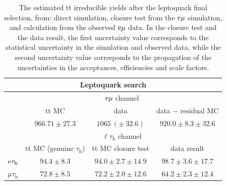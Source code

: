 \documentclass[12pt]{thesis}  %
\newcommand{\tauh}{\ensuremath{\tau_{\text{h}}}\xspace}
\newcommand{\Pe}{\ensuremath{\cmsSymbolFace{e}}\xspace}
\newcommand{\mutau}{\ensuremath{\mu\tauh}\xspace}
\newcommand{\etau}{\ensuremath{\Pe\tauh}\xspace}
\newcommand{\emu}{\ensuremath{\Pe\mu}\xspace}
\newcommand{\ltau}{\ensuremath{\ell\tauh}\xspace}
\renewcommand{\ttbar}{\ensuremath{\mathrm{t}\overline{\mathrm{t}}}\xspace}
\begin{document}
\begin{table}[hbt]
  \begin{center}
    \begin{tabular}{|l|c|c|c|}
	  \multicolumn{4}{c}{Leptoquark search} \\
      \hline
      \multirow{3}{*}{} & \multicolumn{3}{c|}{$\emu$ channel} \\
      \cline{2-4}
      & \ttbar MC & data & data $-$ residual MC \\
      \cline{2-4}
      & $966.71 \pm 27.3$ & $1065~(\pm~32.6)$ & $920.0 \pm 8.3 \pm 32.6$  \\
      \hline\hline
      \multirow{2}{*}{} & \multicolumn{3}{c|}{$\ltau$ channel} \\
      \hline
      channel & \ttbar MC (genuine \tauh) & \ttbar MC closure test & data result \\
      \hline
      $\etau$         & $94.4\pm8.3$ & $94.0\pm2.7\pm14.9$ & $98.7\pm3.6\pm17.7$ \\ %
      $\mutau$       & $72.8\pm8.5$ & $72.2\pm2.0\pm12.6$ & $64.2\pm2.3\pm12.4$ \\ %
      \hline
    \end{tabular}
    \caption{The estimated \ttbar irreducible yields after the leptoquark final selection, from: direct simulation, closure test from the $\emu$ simulation, and calculation from the observed $\emu$ data. In the closure test and the data result, the first uncertainty value corresponds to the statistical uncertainty in the simulation and observed data, while the second uncertainty value corresponds to the propagation of the uncertainties in the acceptances, efficiencies and scale factors. }
    \label{tab:ttYieldsLQ}
  \end{center}
\end{table}
\end{document}
